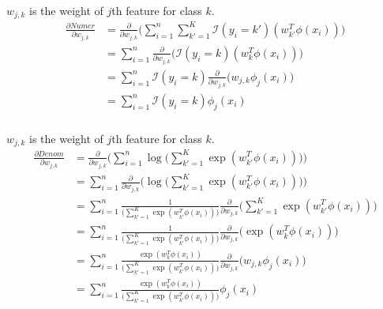 \documentclass[12pt, fleqn]{article}
\begin{document}
\subsubsection{}
$w_{j,k}$ is the weight of $j$th feature for class $k$.
\begin{equation*}
  \begin{aligned}
    \frac{\partial Numer}{\partial w_{j,k}} & = \frac{\partial}{\partial w_{j,k}} \bigg( \sum_{i=1}^n \sum_{k'=1}^K \mathcal{I}(y_i = k') (w_{k'}^T \phi(x_i)) \bigg) \\
                                            & = \sum_{i=1}^n \frac{\partial}{\partial w_{j,k}} \bigg( \mathcal{I}(y_i = k) (w_k^T \phi(x_i)) \bigg)                   \\
                                            & = \sum_{i=1}^n \mathcal{I}(y_i = k) \frac{\partial}{\partial w_{j,k}} \bigg( w_{j,k} \phi_j(x_i) \bigg)                 \\
                                            & = \sum_{i=1}^n \mathcal{I}(y_i = k) \phi_j(x_i)
  \end{aligned}
\end{equation*}

\subsubsection{}
$w_{j,k}$ is the weight of $j$th feature for class $k$.
\begin{equation*}
  \begin{aligned}
    \frac{\partial Denom}{\partial w_{j,k}} & = \frac{\partial}{\partial w_{j,k}} \bigg( \sum_{i=1}^n \log \bigg( \sum_{k'=1}^K \exp (w_{k'}^T \phi(x_i)) \bigg) \bigg)                                                 \\
                                            & = \sum_{i=1}^n \frac{\partial}{\partial w_{j,k}} \bigg( \log \bigg( \sum_{k'=1}^K \exp (w_{k'}^T \phi(x_i)) \bigg) \bigg)                                                 \\
                                            & = \sum_{i=1}^n \frac{1}{\bigg( \sum_{k'=1}^K \exp (w_{k'}^T \phi(x_i)) \bigg)} \frac{\partial}{\partial w_{j,k}} \bigg( \sum_{k'=1}^K \exp (w_{k'}^T \phi(x_i)) \bigg)    \\
                                            & = \sum_{i=1}^n \frac{1}{\bigg( \sum_{k'=1}^K \exp (w_{k'}^T \phi(x_i)) \bigg)} \frac{\partial}{\partial w_{j,k}} \bigg( \exp (w_{k}^T \phi(x_i)) \bigg)                   \\
                                            & = \sum_{i=1}^n \frac{\exp (w_{k}^T \phi(x_i))}{\bigg( \sum_{k'=1}^K \exp (w_{k'}^T \phi(x_i)) \bigg)} \frac{\partial}{\partial w_{j,k}} \bigg( w_{j,k} \phi_j(x_i) \bigg) \\
                                            & = \sum_{i=1}^n \frac{\exp (w_{k}^T \phi(x_i))}{\bigg( \sum_{k'=1}^K \exp (w_{k'}^T \phi(x_i)) \bigg)} \phi_j(x_i)
  \end{aligned}
\end{equation*}
\end{document}
